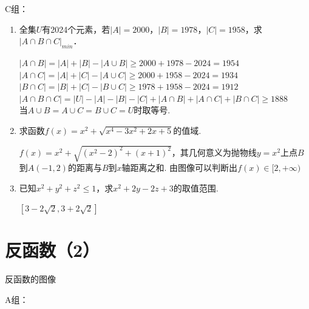 C组：
\begin{enumerate}
    \item 全集$U$有2024个元素，若$|A| = 2000$，$|B| = 1978$，$|C| = 1958$，求$|A\cap B \cap C|_{min}$．
    \begin{jieda}
    $|A \cap B| = |A| + |B| - |A \cup B| \geq 2000 + 1978 - 2024 = 1954$ \\
    $|A \cap C| = |A| + |C| - |A \cup C| \geq 2000 + 1958 - 2024 = 1934$ \\
    $|B \cap C| = |B| + |C| - |B \cup C| \geq 1978 + 1958 - 2024 = 1912$ \\
    $|A\cap B \cap C| = |U| - |A| - |B| - |C| + |A \cap B| + |A \cap C| + |B \cap C| \geq 1888$ \\
    当$A \cup B = A \cup C = B \cup C = U$时取等号.
    \end{jieda}
    \begin{vspace_}
        \vsp[3]
    \end{vspace_}
    \item 求函数$f(x) = x^2 + \sqrt{x^4 - 3x^2+2x+5}$的值域.
    \begin{jieda}
    $f(x) = x^2 + \sqrt{(x^2-2)^2+(x+1)^2}$，其几何意义为抛物线$y = x^2$上点$B$到$A(-1, 2)$的距离与$B$到$x$轴距离之和. 由图像可以判断出$f(x) \in [2, +\infty)$ 
    
    \end{jieda}
    \item 已知$x^2+y^2+z^2 \leq 1$，求$x^2+2y-2z+3$的取值范围.
    \begin{jieda}
        $[3-2\sqrt{2}, 3+2\sqrt{2}]$
    \end{jieda}
\end{enumerate}

\section*{反函数（2）}

\zsd 反函数的图像

A组：

